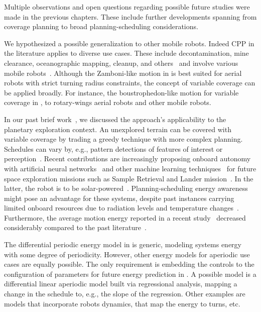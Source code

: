 Multiple observations and open questions regarding possible future studies were made in the previous chapters. These include further developments spanning from coverage planning to broad planning-scheduling considerations.


We hypothesized a possible generalization to other mobile robots. Indeed CPP in the literature applies to diverse use cases. These include decontamination, mine clearance, oceanographic mapping, cleanup, and others~\citep{choset1998coverage} and involve various mobile robots~\citep{galceran2013survey}. Although the Zamboni-like motion in  is best suited for aerial robots with strict turning radius constraints, the concept of variable coverage can be applied broadly. For instance, the boustrophedon-like motion for variable coverage in , to rotary-wings aerial robots and other mobile robots.

In our past brief work~\citep{seewald2020beyond}, we discussed the approach's applicability to the planetary exploration context. An unexplored terrain can be covered with variable coverage by trading a greedy technique with more complex planning. Schedules can vary by, e.g., pattern detections of features of interest or perception~\citep{ondruska2015scheduled}. Recent contributions are increasingly proposing onboard autonomy with artificial neural networks~\citep{gankidi2017fpga} and other machine learning techniques~\citep{ono2020maars} for future space exploration missions such as Sample Retrieval and Lander mission~\citep{muirhead2019mars}. In the latter, the robot is to be solar-powered~\citep{higa2019vision}. Planning-scheduling energy awareness might pose an advantage for these systems, despite past instances carrying limited onboard resources due to radiation levels and temperature changes~\citep{bajracharya2008autonomy,gankidi2017fpga}. Furthermore, the average motion energy reported in a recent study~\citep{ishigami2011path} decreased considerably compared to the past literature~\citep{krotkov1992performance}.


The differential periodic energy model in  is generic, modeling systems energy with some degree of periodicity. However, other energy models for aperiodic use cases are equally possible. The only requirement is embedding the controls to the configuration of parameters for future energy prediction in . A possible model is a differential linear aperiodic model built via regressional analysis, mapping a change in the schedule to, e.g., the slope of the regression. Other examples are models that incorporate robots dynamics, that map the energy to turns, etc.

